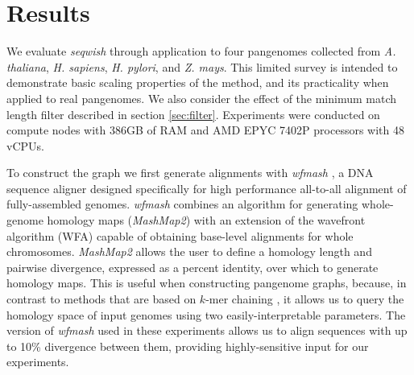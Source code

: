 \documentclass{bioinfo}
\theoremstyle{definition}
\newcommand{\red}[1]{{\textcolor{Red}{#1}}}
\newcommand{\FIXME}[1]{\red{[FIXME: #1]}}
\begin{document}




\section{Results}
\label{sec:results}

We evaluate \textit{seqwish} through application to four pangenomes collected from \textit{A. thaliana}, \textit{H. sapiens}, \textit{H. pylori}, and \textit{Z. mays}.
This limited survey is intended to demonstrate basic scaling properties of the method, and its practicality when applied to real pangenomes.
We also consider the effect of the minimum match length filter described in section \ref{sec:filter}.
Experiments were conducted on compute nodes with 386GB of RAM and AMD EPYC 7402P processors with 48 vCPUs.


To construct the graph we first generate alignments with \textit{wfmash} \citep{wfmash}, a DNA sequence aligner designed specifically for high performance all-to-all alignment of fully-assembled genomes.
\textit{wfmash} combines an algorithm for generating whole-genome homology maps (\textit{MashMap2}) \citep{Jain_2018} with an extension of the wavefront algorithm (WFA) \citep{Marco_Sola_2020} capable of obtaining base-level alignments for whole chromosomes.
\textit{MashMap2} allows the user to define a homology length and pairwise divergence, expressed as a percent identity, over which to generate homology maps.
This is useful when constructing pangenome graphs, because, in contrast to methods that are based on $k$-mer chaining \citep{harris2007lastz,Li_2018}, it allows us to query the homology space of input genomes using two easily-interpretable parameters.
The version of \textit{wfmash} used in these experiments allows us to align sequences with up to 10\% divergence between them, providing highly-sensitive input for our experiments.
\end{document}
